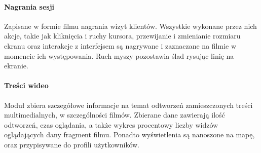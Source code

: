 \paragraph{Nagrania sesji}
Zapisane w formie filmu nagrania wizyt klientów. Wszystkie wykonane przez nich akcje, takie jak kliknięcia i ruchy kursora, przewijanie i zmienianie rozmiaru ekranu oraz interakcje z interfejsem są nagrywane i zaznaczane na filmie w momencie ich występowania. Ruch myszy pozostawia ślad rysując linię na ekranie.

\paragraph{Treści wideo}
Moduł zbiera szczegółowe informacje na temat odtworzeń zamieszczonych treści multimedialnych, w szczególności filmów. Zbierane dane zawierają ilość odtworzeń, czas oglądania, a także wykres procentowy liczby widzów oglądających dany fragment filmu. Ponadto wyświetlenia są nanoszone na mapę, oraz przypisywane do profili użytkowników.
